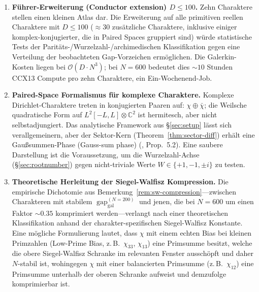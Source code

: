 \documentclass[10pt,twocolumn]{article}
\theoremstyle{definition}
\theoremstyle{remark}
\newcommand{\gap}{\operatorname{gap}}
\newcommand{\chifn}{\chi}
\begin{document}
\begin{enumerate}
{    und welche nicht.} Der vorliegende Atlas liefert die erste
    quantitative Evidenz dafür, dass Low-Conductor-Dirichlet-Charaktere
    die zweite Klasse (keine Branch-lokale Hilbert-P\'olya-Struktur
    bei endlichem $\lambda$) bevölkern, womit das Randtheorem (boundary theorem)
    geschärft wird, das den Baum ordnen wird.
  \item \textbf{Führer-Erweiterung (Conductor extension) $D\leq 100$.}
    Zehn Charaktere stellen einen kleinen Atlas dar. Die Erweiterung auf alle primitiven
    reellen Charaktere mit $D\leq 100$ ($\approx 30$ zusätzliche
    Charaktere, inklusive einiger komplex-konjugierter, die in
    Paired Spaces gruppiert sind) würde statistische Tests der
    Paritäts-/Wurzelzahl-/archimedischen Klassifikation gegen eine
    Verteilung der beobachteten Gap-Vorzeichen ermöglichen. Die Galerkin-Kosten liegen bei
    $\mathcal{O}(D\cdot N^3)$; bei $N=600$ bedeutet dies $\sim 10$ Stunden
    CCX13 Compute pro zehn Charaktere, ein Ein-Wochenend-Job.
  \item \textbf{Paired-Space Formalismus für komplexe Charaktere.}
    Komplexe Dirichlet-Charaktere treten in konjugierten Paaren auf:
    $\chifn\oplus\bar\chifn$; die Weilsche quadratische Form auf
    $L^2[-L,L]\otimes\mathbb{C}^2$ ist hermitesch, aber nicht
    selbstadjungiert. Das analytische Framework aus \S\ref{sec:setup}
    lässt sich verallgemeinern, aber der Sektor-Kern
    (Theorem~\ref{thm:sector-diff}) erhält eine Gaußsummen-Phase (Gauss-sum phase)
    (\cite{AnalyticKernel}, Prop.~5.2). Eine saubere Darstellung ist
    die Voraussetzung, um die Wurzelzahl-Achse
    (\S\ref{sec:rootnumber}) gegen nicht-triviale Werte $W\in
    \{+1,-1,\pm i\}$ zu testen.
  \item \textbf{Theoretische Herleitung der Siegel-Walfisz
    Kompression.} Die empirische Dichotomie aus
    Bemerkung~\ref{rem:sw-compression}---zwischen Charakteren mit
    stabilem $\gap_{\mathrm{gal}}^{(N=200)}$ und jenen, die bei $N=600$
    um einen Faktor $\sim 0.35$ komprimiert werden---verlangt nach einer
    theoretischen Klassifikation anhand der charakter-spezifischen
    Siegel-Walfisz Konstante. Eine mögliche Formulierung lautet,
    dass $\chifn$ mit einem echten Bias bei kleinen Primzahlen (Low-Prime Bias, z.\,B.\ $\chifn_{33}$,
    $\chifn_{13}$) eine Primsumme besitzt, welche die
    obere Siegel-Walfisz Schranke im relevanten Fenster ausschöpft und
    daher $N$-stabil ist, wohingegen $\chifn$ mit einer balancierten Primsumme
    (z.\,B.\ $\chifn_{12}$) eine Primsumme unterhalb der oberen
    Schranke aufweist und demzufolge komprimierbar ist.
\end{enumerate}
\end{document}
